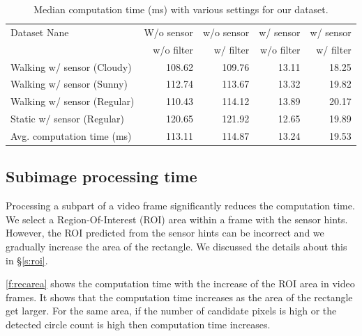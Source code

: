 \begin{table}[!ht]
  \centering
  \caption{Median computation time (ms) with various settings for our dataset.}
  \label{t:dataset_time}
  \begin{tabular}{  l r r r r}
    \rowcolor{gray!50}
    Dataset Nane & W/o sensor & w/o sensor & w/ sensor  & w/ sensor \\
    \rowcolor{gray!50}
    & w/o filter & w/ filter & w/o filter & w/ filter\\
    \hline
    Walking w/ sensor (Cloudy) & 108.62 & 109.76 & 13.11 & 18.25 \\
    Walking w/ sensor (Sunny) & 112.74 & 113.67 & 13.32 & 19.82 \\
    Walking w/ sensor (Regular) & 110.43 & 114.12 & 13.89 & 20.17 \\
    Static w/ sensor (Regular) & 120.65 & 121.92 & 12.65 & 19.89\\
    \hline
    Avg. computation time (ms) & 113.11 & 114.87 & 13.24 & 19.53\\
    
  \end{tabular}
\end{table}

\subsection{Subimage processing time}
Processing a subpart of a video frame significantly reduces the computation time. 
We select a Region-Of-Interest (ROI) area within a frame with the sensor hints.
However, the ROI predicted from the sensor hints can be incorrect and we gradually increase the area of the rectangle.
We discussed the details about this in \S\ref{s:roi}.


\ref{f:recarea} shows the computation time with the increase of the ROI area in video frames.
It shows that the computation time increases as the area of the rectangle get larger.
For the same area, if the number of candidate pixels is high or the detected circle count is high then computation time increases.

